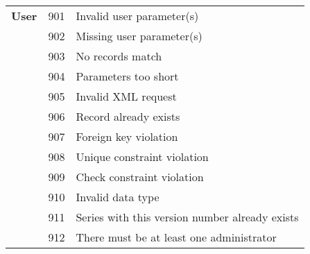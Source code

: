 \begin{longtable}{lll}
  \textbf{User} 
  & 901 & Invalid user parameter(s) \\
  & 902 & Missing user parameter(s) \\
  & 903 & No records match \\
  & 904 & Parameters too short \\
  & 905 & Invalid XML request \\
  & 906 & Record already exists \\
  & 907 & Foreign key violation \\
  & 908 & Unique constraint violation \\
  & 909 & Check constraint violation \\
  & 910 & Invalid data type \\
  & 911 & Series with this version number already exists \\
  & 912 & There must be at least one administrator \\

  \bottomrule
\end{longtable}